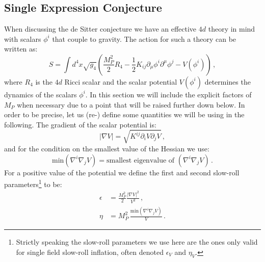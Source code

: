 \documentclass[a4paper,12pt,twoside,openright]{report}
\newcommand{\be}{\begin{equation}}
\newcommand{\ee}{\end{equation}}
\newcommand{\bea}{\begin{equation}\begin{aligned}}
\newcommand{\eea}{\end{aligned}\end{equation}}
\begin{document}
\subsection{Single Expression Conjecture}
When discussing the de Sitter conjecture we have an effective $4d$ theory in mind with scalars $\phi^ i$ that couple to gravity. The action for such a theory can be written as:
\be 
S = \int d^4x \sqrt{g_4} \left(\frac{M_P^ 2}{2} R_4 - \frac{1}{2} K_{ij} \partial_\mu \phi^ i \partial^ \mu \phi^ j - V(\phi^ i)\right)\,,
\label{eq:leeact}
\ee
where $R_4$ is the $4d$ Ricci scalar and the scalar potential $V(\phi^ i)$ determines the dynamics of the scalars $\phi^ i$. In this section we will include the explicit factors of $M_P$ when necessary due to a point that will be raised further down below. In order to be precise, let us (re-) define some quantities we will be using in the following. The gradient of the scalar potential is:
\be 
|\nabla V| = \sqrt{K^{ij}\partial_i V \partial_j V}\,,
\ee
and for the condition on the smallest value of the Hessian we use:
\be 
\text{min}(\nabla^i \nabla_j V) = \text{smallest eigenvalue of }(\nabla^i \nabla_j V)\,.
\ee
For a positive value of the potential we define the first and second slow-roll parameters\footnote{Strictly speaking the slow-roll parameters we use here are the ones only valid for single field slow-roll inflation, often denoted $\epsilon_V$ and $\eta_V$.} to be:
\bea 
\epsilon &= \frac{M_P^ 2}{2} \frac{|\nabla V|^2}{V^2}\,,\\
\eta &= M_P^ 2 \, \frac{\text{min}(\nabla^i \nabla_j V)}{V}\,.
\eea
\end{document}

